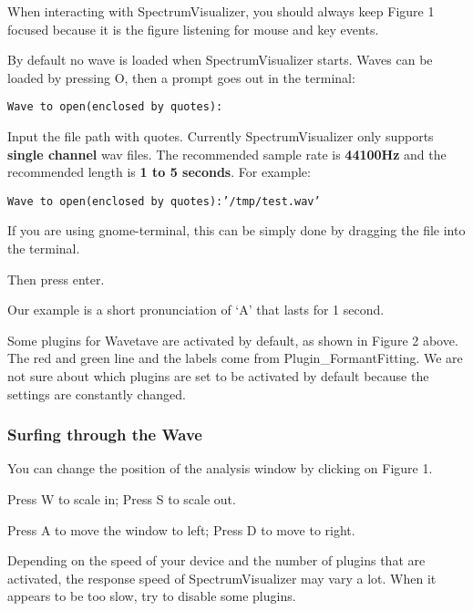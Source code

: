         When interacting with SpectrumVisualizer, you should always keep Figure 1 focused because it is the figure listening for mouse and key events.
        
        By default no wave is loaded when SpectrumVisualizer starts. Waves can be loaded by pressing O, then a prompt goes out in the terminal:
        
        \bigskip
        \texttt{Wave to open(enclosed by quotes):}
        \bigskip
        
        Input the file path with quotes. Currently SpectrumVisualizer only supports \textbf{single channel} wav files. The recommended sample rate is \textbf{44100Hz} and the recommended length is \textbf{1 to 5 seconds}. For example:
        
        \bigskip
        \texttt{Wave to open(enclosed by quotes):'/tmp/test.wav'}
        \bigskip
        
        If you are using gnome-terminal, this can be simply done by dragging the file into the terminal.

        Then press enter.
        
        Our example is a short pronunciation of `A' that lasts for 1 second.
        
        \newpage
        
        
        Some plugins for Wavetave are activated by default, as shown in Figure 2 above. The red and green line and the labels come from Plugin\_FormantFitting. We are not sure about which plugins are set to be activated by default because the settings are constantly changed.
        
        \subsubsection{Surfing through the Wave}\indent
        
        You can change the position of the analysis window by clicking on Figure 1.
        
        Press W to scale in; Press S to scale out.
        
        Press A to move the window to left; Press D to move to right.
        
        Depending on the speed of your device and the number of plugins that are activated, the response speed of SpectrumVisualizer may vary a lot. When it appears to be too slow, try to disable some plugins.
        
